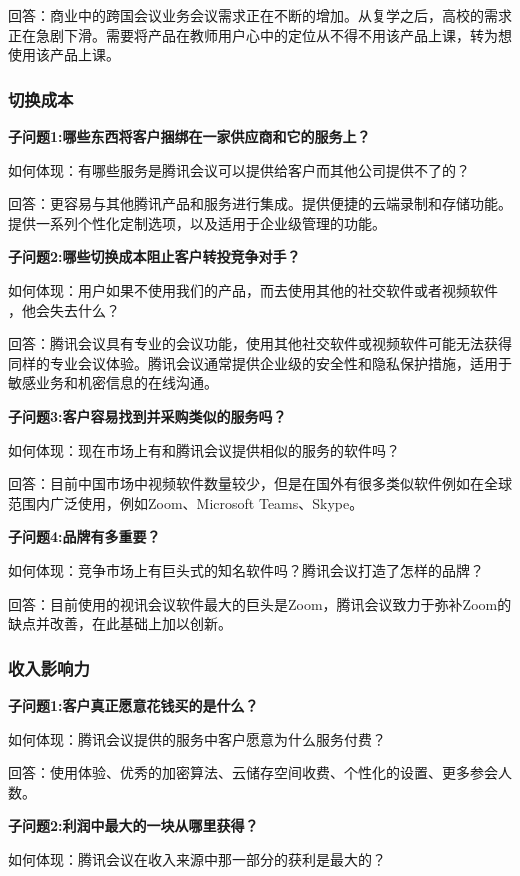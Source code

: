 \documentclass[a4paper,12pt]{article}
\begin{document}
    回答：商业中的跨国会议业务会议需求正在不断的增加。从复学之后，高校的需求正在急剧下滑。需要将产品在教师用户心中的定位从不得不用该产品上课，转为想使用该产品上课。
    
    \subsubsection{切换成本}
    \textbf{子问题1:哪些东西将客户捆绑在一家供应商和它的服务上？}

    如何体现：有哪些服务是腾讯会议可以提供给客户而其他公司提供不了的？

    回答：更容易与其他腾讯产品和服务进行集成。提供便捷的云端录制和存储功能。提供一系列个性化定制选项，以及适用于企业级管理的功能。

    \textbf{子问题2:哪些切换成本阻止客户转投竞争对手？}

    如何体现：用户如果不使用我们的产品，而去使用其他的社交软件或者视频软件 ，他会失去什么？

    回答：腾讯会议具有专业的会议功能，使用其他社交软件或视频软件可能无法获得同样的专业会议体验。腾讯会议通常提供企业级的安全性和隐私保护措施，适用于敏感业务和机密信息的在线沟通。

    \textbf{子问题3:客户容易找到并采购类似的服务吗？}

    如何体现：现在市场上有和腾讯会议提供相似的服务的软件吗？

    回答：目前中国市场中视频软件数量较少，但是在国外有很多类似软件例如在全球范围内广泛使用，例如Zoom、Microsoft Teams、Skype。

    \textbf{子问题4:品牌有多重要？}

    如何体现：竞争市场上有巨头式的知名软件吗？腾讯会议打造了怎样的品牌？

    回答：目前使用的视讯会议软件最大的巨头是Zoom，腾讯会议致力于弥补Zoom的缺点并改善，在此基础上加以创新。

    \subsubsection{收入影响力}
    \textbf{子问题1:客户真正愿意花钱买的是什么？}

    如何体现：腾讯会议提供的服务中客户愿意为什么服务付费？

    回答：使用体验、优秀的加密算法、云储存空间收费、个性化的设置、更多参会人数。
    
    \textbf{子问题2:利润中最大的一块从哪里获得？}

    如何体现：腾讯会议在收入来源中那一部分的获利是最大的？
\end{document}
